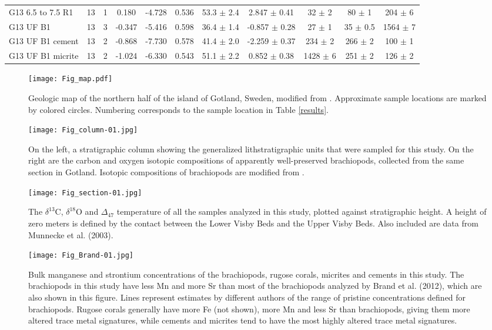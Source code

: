 \documentclass{article}
\newcommand{\deltao}{$\delta^{18}$}
\newcommand{\deltac}{$\delta^{13}$}
\begin{document}
\begin{sidewaystable}[htbp]
\begin{tabular}{ | l | c | c | c | c | c | c | c | c | c | c | }
G13 6.5 to 7.5 R1 & 13 & 1 & 0.180 & -4.728 & 0.536 & 53.3 $\pm$ 2.4 & 2.847 $\pm$ 0.41 & 32 $\pm$ 2 & 80 $\pm$ 1 & 204 $\pm$ 6 \\
G13 UF B1 & 13 & 3 & -0.347 & -5.416 & 0.598 & 36.4 $\pm$ 1.4 & -0.857 $\pm$ 0.28 & 27 $\pm$ 1 & 35 $\pm$ 0.5 & 1564 $\pm$ 7 \\
G13 UF B1 cement & 13 & 2 & -0.868 & -7.730 & 0.578 & 41.4 $\pm$ 2.0 & -2.259 $\pm$ 0.37 & 234 $\pm$ 2 & 266 $\pm$ 2 & 100 $\pm$ 1 \\
G13 UF B1 micrite & 13 & 2 & -1.024 & -6.330 & 0.543 & 51.1 $\pm$ 2.2 & 0.852 $\pm$ 0.38 & 1428 $\pm$ 6 & 251 $\pm$ 2 & 126 $\pm$ 2 \\
\end{tabular} 
\end{sidewaystable}

\begin{figure}[p]
\centering
\texttt{[image: Fig\_map.pdf]}
\caption{Geologic map of the northern half of the island of Gotland, Sweden, modified from \cite{Calner2004a}. Approximate sample locations are marked by colored circles. Numbering corresponds to the sample location in Table \ref{results}.}
\label{map}
\end{figure}

\begin{figure}[htb]
\centering
\texttt{[image: Fig\_column-01.jpg]}
\caption{On the left, a stratigraphic column showing the generalized lithstratigraphic units that were sampled for this study. On the right are the carbon and oxygen isotopic compositions of apparently well-preserved brachiopods, collected from the same section in Gotland. Isotopic compositions of brachiopods are modified from \cite{Bickert1997}.}
\label{column}
\end{figure}

\begin{sidewaysfigure}[htb]
\centering
\texttt{[image: Fig\_section-01.jpg]}
\caption{The \deltac C, \deltao O and $\Delta_{47}$ temperature of all the samples analyzed in this study, plotted against stratigraphic height. A height of zero meters is defined by the contact between the Lower Visby Beds and the Upper Visby Beds. Also included are data from Munnecke et al. (2003).}
\label{section}
\end{sidewaysfigure}

\begin{figure}[htb]
\centering
\texttt{[image: Fig\_Brand-01.jpg]}
\caption{Bulk manganese and strontium concentrations of the brachiopods, rugose corals, micrites and cements in this study. The brachiopods in this study have less Mn and more Sr than most of the brachiopods analyzed by Brand et al. (2012), which are also shown in this figure. Lines represent estimates by different authors of the range of pristine concentrations defined for brachiopods. Rugose corals generally have more Fe (not shown), more Mn and less Sr than brachiopods, giving them more altered trace metal signatures, while cements and micrites tend to have the most highly altered trace metal signatures.}
\label{Brand}
\end{figure}
\end{document}
